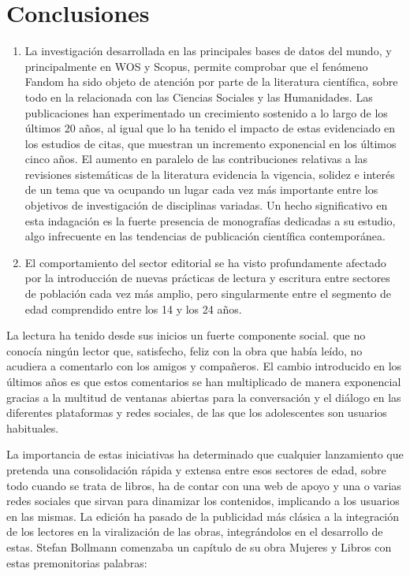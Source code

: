 \documentclass[spanish]{textolivre}
\begin{document}
\section{Conclusiones}\label{sec-formato}
\begin{enumerate}
    \item La investigación desarrollada en las principales bases de datos del mundo, y principalmente en WOS y Scopus, permite comprobar que el fenómeno Fandom ha sido objeto de atención por parte de la literatura científica, sobre todo en la relacionada con las Ciencias Sociales y las Humanidades. Las publicaciones han experimentado un crecimiento sostenido a lo largo de los últimos 20 años, al igual que lo ha tenido el impacto de estas evidenciado en los estudios de citas, que muestran un incremento exponencial en los últimos cinco años. El aumento en paralelo de las contribuciones relativas a las revisiones sistemáticas de la literatura evidencia la vigencia, solidez e interés de un tema que va ocupando un lugar cada vez más importante entre los objetivos de investigación de disciplinas variadas. Un hecho significativo en esta indagación es la fuerte presencia de monografías dedicadas a su estudio, algo infrecuente en las tendencias de publicación científica contemporánea.
    \item El comportamiento del sector editorial se ha visto profundamente afectado por la introducción de nuevas prácticas de lectura y escritura entre sectores de población cada vez más amplio, pero singularmente entre el segmento de edad comprendido entre los 14 y los 24 años.
\end{enumerate}

La lectura ha tenido desde sus inicios un fuerte componente social. \textcite{basanta_leer_2019} que no conocía ningún lector que, satisfecho, feliz con la obra que había leído, no acudiera a comentarlo con los amigos y compañeros. El cambio introducido en los últimos años es que estos comentarios se han multiplicado de manera exponencial gracias a la multitud de ventanas abiertas para la conversación y el diálogo en las diferentes plataformas y redes sociales, de las que los adolescentes son usuarios habituales. 

La importancia de estas iniciativas ha determinado que cualquier lanzamiento que pretenda una consolidación rápida y extensa entre esos sectores de edad, sobre todo cuando se trata de libros, ha de contar con una web de apoyo y una o varias redes sociales que sirvan para dinamizar los contenidos, implicando a los usuarios en las mismas. La edición ha pasado de la publicidad más clásica a la integración de los lectores en la viralización de las obras, integrándolos en el desarrollo de estas. Stefan Bollmann comenzaba un capítulo de su obra Mujeres y Libros con estas premonitorias palabras:
\end{document}
